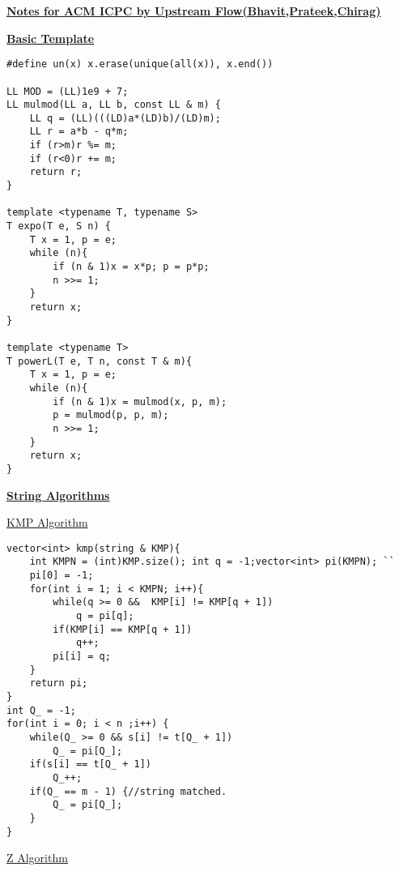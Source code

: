 \documentclass[10pt,a4paper]{report}
\begin{document}
\begin{landscape}
\begin{multicols}{2}
\begin{center}
\textbf{\underline{Notes for ACM ICPC by Upstream Flow(Bhavit,Prateek,Chirag)}}
\end{center}

	\underline{\textbf{Basic Template}}
\begin{verbatim}
#define un(x) x.erase(unique(all(x)), x.end())

LL MOD = (LL)1e9 + 7; 
LL mulmod(LL a, LL b, const LL & m) {
	LL q = (LL)(((LD)a*(LD)b)/(LD)m); 
	LL r = a*b - q*m; 
	if (r>m)r %= m; 
	if (r<0)r += m; 
	return r; 
}

template <typename T, typename S>
T expo(T e, S n) { 
	T x = 1, p = e; 
	while (n){
		if (n & 1)x = x*p; p = p*p;
		n >>= 1; 
	}
	return x;
}

template <typename T>
T powerL(T e, T n, const T & m){
	T x = 1, p = e; 
	while (n){
		if (n & 1)x = mulmod(x, p, m); 
		p = mulmod(p, p, m); 
		n >>= 1; 
	}
	return x;
}
\end{verbatim}
\newpage
\begin{center}
	\underline{\textbf{String Algorithms}}
\end{center}

\begin{flushleft}
	\underline{KMP Algorithm}
\end{flushleft}

\begin{verbatim}
vector<int> kmp(string & KMP){
    int KMPN = (int)KMP.size(); int q = -1;vector<int> pi(KMPN); ``
    pi[0] = -1;
    for(int i = 1; i < KMPN; i++){
        while(q >= 0 &&  KMP[i] != KMP[q + 1])
            q = pi[q];
        if(KMP[i] == KMP[q + 1])
            q++;
        pi[i] = q;
    }
    return pi; 
}
int Q_ = -1; 
for(int i = 0; i < n ;i++) {
    while(Q_ >= 0 && s[i] != t[Q_ + 1])
        Q_ = pi[Q_];
    if(s[i] == t[Q_ + 1])
        Q_++;
    if(Q_ == m - 1) {//string matched. 
        Q_ = pi[Q_];
    }
}
\end{verbatim}

\begin{flushleft}
\underline{Z Algorithm}
\end{flushleft}
\begin{verbatim}


\end{verbatim}
\end{multicols}
\end{landscape}
\end{document}
